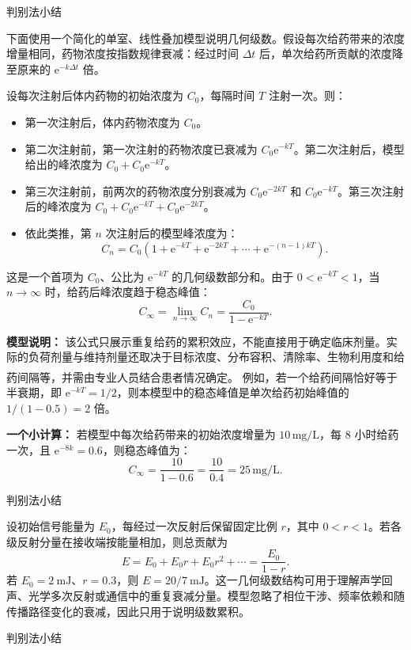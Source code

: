 \documentclass[aspectratio=169,10pt,fontset=fandol]{ctexbeamer}
\newcommand{\ee}{\mathrm{e}}
\newcommand{\upcite}[1]{\textsuperscript{\textsuperscript{\cite{#1}}}}
\begin{document}
\begin{frame}[t,fragile]{判别法小结}
\footnotesize
{\footnotesize
\begin{application}

下面使用一个简化的单室、线性叠加模型说明几何级数。假设每次给药带来的浓度增量相同，药物浓度按指数规律衰减：经过时间 \(\Delta t\) 后，单次给药所贡献的浓度降至原来的 \(\ee^{-k\Delta t}\) 倍。

设每次注射后体内药物的初始浓度为 \(C_0\)，每隔时间 \(T\) 注射一次。则：
\begin{itemize}
\item 第一次注射后，体内药物浓度为 \(C_0\)。
\item 第二次注射前，第一次注射的药物浓度已衰减为 \(C_0\ee^{-kT}\)。第二次注射后，模型给出的峰浓度为 \(C_0+C_0\ee^{-kT}\)。
\item 第三次注射前，前两次的药物浓度分别衰减为 \(C_0\ee^{-2kT}\) 和 \(C_0\ee^{-kT}\)。第三次注射后的峰浓度为 \(C_0+C_0\ee^{-kT}+C_0\ee^{-2kT}\)。
\item 依此类推，第 \(n\) 次注射后的模型峰浓度为：
\[
C_n=C_0\left(1+\ee^{-kT}+\ee^{-2kT}+\cdots+\ee^{-(n-1)kT}\right).
\]
\end{itemize}

这是一个首项为 \(C_0\)、公比为 \(\ee^{-kT}\) 的几何级数部分和。由于 \(0<\ee^{-kT}<1\)，当 \(n\to\infty\) 时，给药后峰浓度趋于稳态峰值：
\[
C_{\infty}=\lim_{n\to\infty}C_n=\frac{C_0}{1-\ee^{-kT}}.
\]

\textbf{模型说明：} 该公式只展示重复给药的累积效应，不能直接用于确定临床剂量。实际的负荷剂量与维持剂量还取决于目标浓度、分布容积、清除率、生物利用度和给药间隔等，并需由专业人员结合患者情况确定。\upcite{NCBISteadyState} 例如，若一个给药间隔恰好等于半衰期，即 \(\ee^{-kT}=1/2\)，则本模型中的稳态峰值是单次给药初始峰值的 \(1/(1-0.5)=2\) 倍。

\textbf{一个小计算：} 若模型中每次给药带来的初始浓度增量为 \(10\,\text{mg/L}\)，每 8 小时给药一次，且 \(\ee^{-8k}=0.6\)，则稳态峰值为：
\[
C_{\infty} = \frac{10}{1 - 0.6} = \frac{10}{0.4} = 25\,\text{mg/L}.
\]
\end{application}
}
\end{frame}
\begin{frame}[t,fragile]{判别法小结}
\footnotesize
{\footnotesize
\begin{application}[工程：多次反射与信号衰减]
设初始信号能量为 $E_0$，每经过一次反射后保留固定比例 $r$，其中 $0<r<1$。若各级反射分量在接收端按能量相加，则总贡献为
\[
E=E_0+E_0r+E_0r^2+\cdots
=\frac{E_0}{1-r}.
\]
若 $E_0=2\ \mathrm{mJ}$、$r=0.3$，则 $E=20/7\ \mathrm{mJ}$。这一几何级数结构可用于理解声学回声、光学多次反射或通信中的重复衰减分量。模型忽略了相位干涉、频率依赖和随传播路径变化的衰减，因此只用于说明级数累积。
\end{application}
}
\end{frame}
\begin{frame}[t,fragile]{判别法小结}
\footnotesize
{\footnotesize


\iffalse



}
\end{frame}
\end{document}
